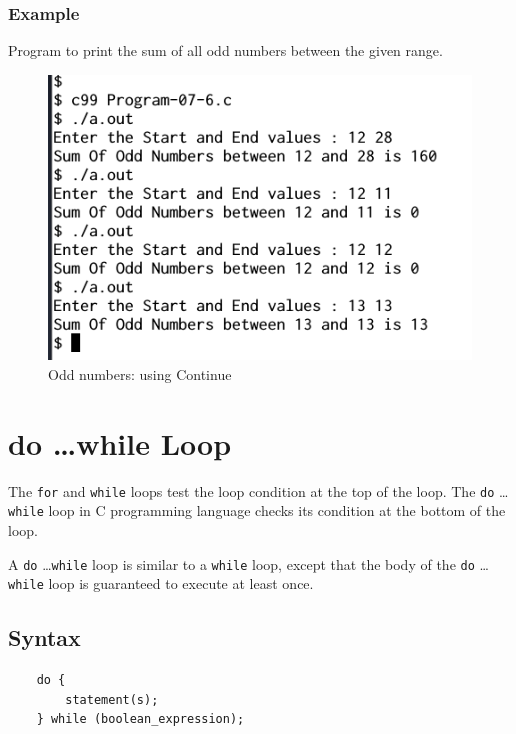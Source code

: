 \documentclass[11pt,a4paper]{article}
\begin{document}
\subsubsection*{Example}

Program to print the sum of all odd numbers between the given range.



\begin{figure}[ht]
\begin{center}
\includegraphics[scale=0.6]{Output-07-6.png}
\caption{Odd numbers: using Continue}
\label{output-07-6}
\end{center}
\end{figure}

\section*{do \ldots while Loop}
The \lstinline!for! and \lstinline!while! loops  test the loop condition at the top of the loop.
The \lstinline!do! \ldots \lstinline!while! loop in C programming language checks its condition at the bottom of the loop.

A \lstinline!do! \ldots \lstinline!while! loop is similar to a \lstinline!while! loop, except that the body of the \lstinline!do! \ldots \lstinline!while! loop is guaranteed to execute at least once.

\subsection*{Syntax}
\begin{verbatim}
    do {
        statement(s);
    } while (boolean_expression);
\end{verbatim}
\end{document}

